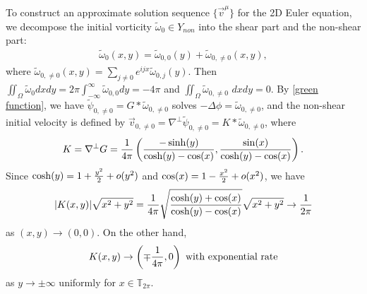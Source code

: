 \documentclass[1 [leqno, 11pt]{amsart}
\numberwithin{equation}{section}
\begin{document}
\begin{CJK*}{GBK}{song}
\begin{appendix}
To construct an approximate solution sequence $\{\vec{v}^{\mu}\}$ for the 2D Euler equation, we decompose the initial vorticity $\tilde\omega_0\in  Y_{non}$ into the shear part and the non-shear part:
\begin{align}\label{shear-energy decomposition}\tilde\omega_0(x,y)=\tilde\omega_{0,0}(y)+ \tilde\omega_{0,\neq0}(x,y),
 \end{align}
 where $\tilde\omega_{0,\neq0}(x,y)=\sum_{j\neq0}e^{ijx}\tilde\omega_{0,j}(y)$. Then $\iint_{\Omega}\tilde\omega_0 dxdy=2\pi\int_{-\infty}^\infty\tilde\omega_{0,0}dy =-4\pi$ and $\iint_{\Omega}\tilde\omega_{0,\neq0}$ $dxdy=0$.
By \eqref{green function}, we have $\tilde\psi_{0,\neq0}=G\ast \tilde\omega_{0,\neq0}$ solves $-\Delta\phi=\tilde\omega_{0,\neq0}$, and the non-shear initial velocity is defined by
 $\vec{v}_{0,\neq0}=\nabla^{\bot}\tilde \psi_{0,\neq0}=K\ast \tilde\omega_{0,\neq0}$, where \begin{align*}
K=\nabla^{\bot}G={1\over4\pi}\left({-\sinh(y)\over \cosh(y)-\cos(x)},{\sin(x)\over \cosh(y)-\cos(x)}\right).
\end{align*}
Since $\cosh(y)=1+{y^2\over2}+o(y^2)$ and $\cos(x)=1-{x^2\over2}+o(x^2)$, we have
\begin{align}\label{K-near-0}
|K(x,y)|\sqrt{x^2+y^2}={1\over4\pi}\sqrt{\cosh(y)+\cos(x)\over \cosh(y)-\cos(x)}\sqrt{x^2+y^2}\to{1\over2\pi}
\end{align}
as $(x,y)\to(0,0)$. On the other hand,
 \begin{align}\label{K-near-pm-infty}
 K(x,y)\to\left(\mp{1\over 4\pi},0\right) \text{ with exponential rate}
 \end{align}
 as $y\to\pm\infty$ uniformly for $x\in \mathbb{T}_{2\pi}$.



\end{appendix}
\end{CJK*}
\end{document}
